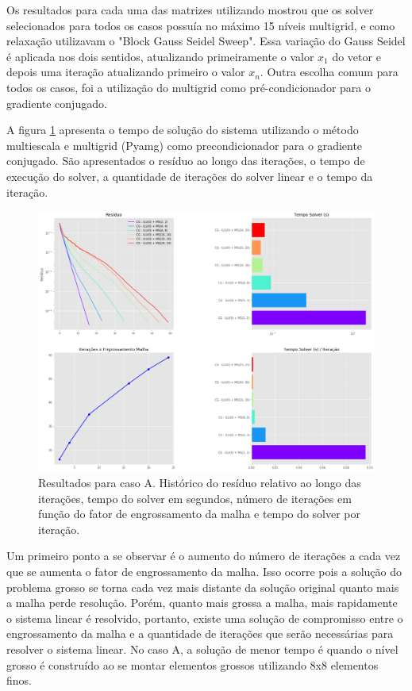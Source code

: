 Os resultados para cada uma das matrizes utilizando mostrou que os solver selecionados para todos os casos possuía no máximo 15 níveis multigrid, e como relaxação utilizavam o "Block Gauss Seidel Sweep". Essa variação do Gauss Seidel é aplicada nos dois sentidos, atualizando primeiramente o valor  $x_1$  do vetor e depois uma iteração atualizando primeiro o valor  $x_n$. Outra escolha comum para todos os casos, foi a utilização do multigrid como pré-condicionador para o gradiente conjugado.


A figura \ref{fig:reservatorio100x100_1} apresenta o tempo de solução do sistema utilizando o método multiescala e multigrid (Pyamg) como precondicionador para o gradiente conjugado. São apresentados o resíduo ao longo das iterações, o tempo de execução do solver, a quantidade de iterações do solver linear e o tempo da iteração.

\begin{figure}[!htbp]
\label{fig:reservatorio100x100_1}
\centering
\includegraphics[width=\textwidth]{chap08/figs/reservatorio100x100_1.png}
\caption{Resultados para caso A. Histórico do resíduo relativo ao longo das iterações, tempo do solver em segundos, número de iterações em função do fator de engrossamento da malha e tempo do solver por iteração. }
\end{figure}

Um primeiro ponto a se observar é o aumento do número de iterações a cada vez que se aumenta o fator de engrossamento da malha. Isso ocorre pois a solução do problema grosso se torna cada vez mais distante da solução  original quanto mais a malha perde resolução. Porém, quanto mais grossa a malha, mais rapidamente o sistema linear é resolvido, portanto, existe uma solução de compromisso entre o engrossamento da malha e a quantidade de iterações que serão necessárias para resolver o sistema linear. No caso A, a solução de menor tempo é quando o nível grosso é construído ao se montar elementos grossos utilizando 8x8 elementos finos. 

